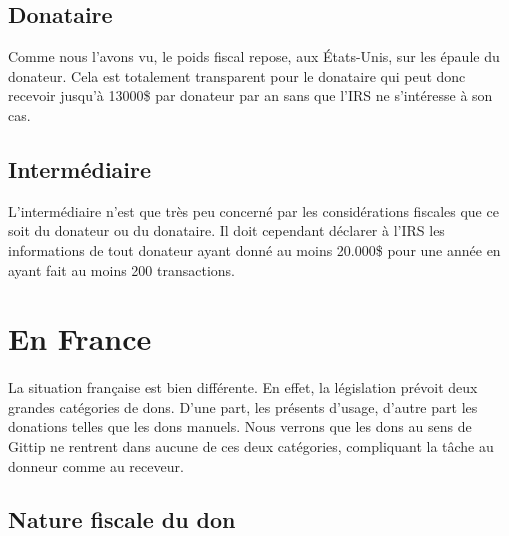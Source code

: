         \subsection{Donataire}
            Comme nous l'avons vu, le poids fiscal repose, aux États-Unis,
            sur les épaule du donateur. Cela est totalement transparent
            pour le donataire qui peut donc recevoir jusqu'à 13000\$
            par donateur par an sans que l'IRS ne s'intéresse à son cas.
        \subsection{Intermédiaire}
            L'intermédiaire n'est que très peu concerné par les
            considérations fiscales que ce soit du donateur ou du donataire.
            Il doit cependant déclarer à l'IRS les informations de
            tout donateur ayant donné au moins 20.000\$ pour une année en
            ayant fait au moins 200 transactions.
    \section{En France}
        \paragraph{}
            La situation française est bien différente. En effet, la
            législation prévoit deux grandes catégories de dons. D'une
            part, les présents d'usage, d'autre part les donations
            telles que les dons manuels. Nous verrons que les dons au sens
            de Gittip ne rentrent dans aucune de ces deux catégories,
            compliquant la tâche au donneur comme au receveur.

        \subsection{Nature fiscale du don}

